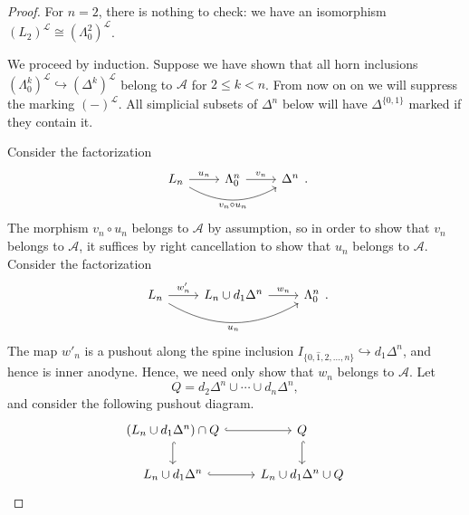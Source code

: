 \documentclass[main.tex]{subfiles}
\begin{document}
\begin{proof}
  For $n = 2$, there is nothing to check: we have an isomorphism $(L_{2})^{\mathcal{L}} \cong (\Lambda^{2}_{0})^{\mathcal{L}}$.

  We proceed by induction. Suppose we have shown that all horn inclusions $(\Lambda^{k}_{0})^{\mathcal{L}} \hookrightarrow (\Delta^{k})^{\mathcal{L}}$ belong to $\mathcal{A}$ for $2 \leq k < n$. From now on on we will suppress the marking $(-)^{\mathcal{L}}$. All simplicial subsets of $\Delta^{n}$ below will have $\Delta^{\{0, 1\}}$ marked if they contain it.

  Consider the factorization
  \begin{equation*}
    \begin{tikzcd}
      L_{n}
      \arrow[r, "u_{n}"]
      \arrow[rr, bend right, swap, "v_{n} \circ u_{n}"]
      & \Lambda^{n}_{0}
      \arrow[r, "v_{n}"]
      & \Delta^{n}
    \end{tikzcd}.
  \end{equation*}
  The morphism $v_{n} \circ u_{n}$ belongs to $\mathcal{A}$ by assumption, so in order to show that $v_{n}$ belongs to $\mathcal{A}$, it suffices by right cancellation to show that $u_{n}$ belongs to $\mathcal{A}$. Consider the factorization
  \begin{equation*}
    \begin{tikzcd}
      L_{n}
      \arrow[r, "w'_{n}"]
      \arrow[rr, bend right, swap, "u_{n}"]
      & L_{n} \cup d_{1} \Delta^{n}
      \arrow[r, "w_{n}"]
      & \Lambda^{n}_{0}
    \end{tikzcd}.
  \end{equation*}
  The map $w'_{n}$ is a pushout along the spine inclusion $I_{\{0, \hat{1}, 2, \ldots, n\}} \hookrightarrow d_{1}\Delta^{n}$, and hence is inner anodyne. Hence, we need only show that $w_{n}$ belongs to $\mathcal{A}$. Let
  \begin{equation*}
    Q = d_{2} \Delta^{n} \cup \cdots \cup d_{n} \Delta^{n},
  \end{equation*}
  and consider the following pushout diagram.
  \begin{equation*}
    \begin{tikzcd}
      (L_{n} \cup d_{1}\Delta^{n}) \cap Q
      \arrow[r, hook]
      \arrow[d, hook]
      & Q
      \arrow[d, hook]
      \\
      L_{n} \cup d_{1} \Delta^{n}
      \arrow[r, hook]
      & L_{n} \cup d_{1}\Delta^{n} \cup Q
    \end{tikzcd}
  \end{equation*}

\end{proof}
\end{document}
